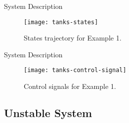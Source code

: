 \begin{slide}{System Description}
  \vspace*{\fill}
  \begin{figure}[ht!]
    \centering
    \captionsetup{justification=centering}
    \texttt{[image: tanks-states]}
    \caption{States trajectory for Example 1.}%
    \label{fig:level-system-control-states}
  \end{figure}
  \vspace*{\fill}
\end{slide}

\begin{slide}{System Description}
  \vspace*{\fill}
  \begin{figure}[ht!]
    \centering
    \captionsetup{justification=centering}
    \texttt{[image: tanks-control-signal]}
    \caption{Control signals for Example 1.}%
    \label{fig:level-system-control-signals}
  \end{figure}
  \vspace*{\fill}
\end{slide}

\subsection{Unstable System}%
\label{subsec:unstable-system}

